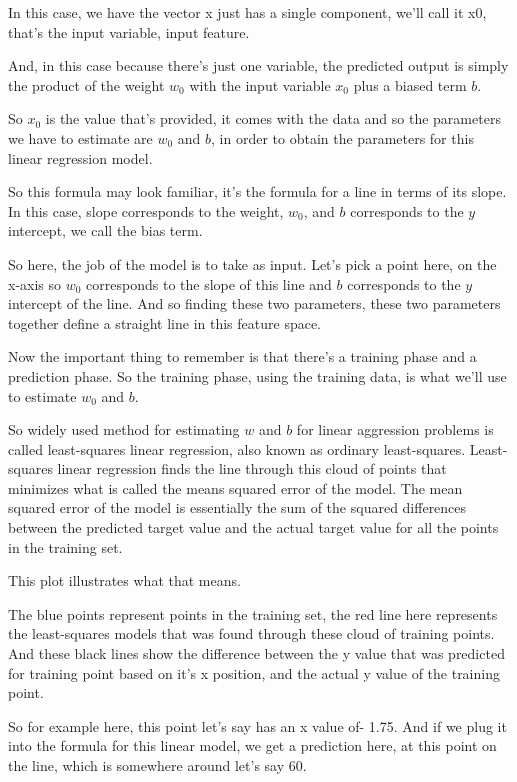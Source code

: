 \begin{multicols}{2}
In this case, we have the vector x just has a single component, we'll call it x0, that's the input variable, input feature. 

And, in this case because there's just one variable, the predicted output is simply the product of the weight $w_0$ with the input variable $x_0$ plus a biased term $b$. 

So $x_0$ is the value that's provided, it comes with the data and so the parameters we have to estimate are $w_0$ and $b$, in order to obtain the parameters for this linear regression model. 

So this formula may look familiar, it's the formula for a line in terms of its slope. In this case, slope corresponds to the weight, $w_0$, and $b$ corresponds to the $y$ intercept, we call the bias term. 

So here, the job of the model is to take as input. Let's pick a point here, on the x-axis so $w_0$ corresponds to the slope of this line and $b$ corresponds to the $y$ intercept of the line. And so finding these two parameters, these two parameters together define a straight line in this feature space. 

Now the important thing to remember is that there's a training phase and a prediction phase. So the training phase, using the training data, is what we'll use to estimate $w_0$ and $b$. 

So widely used method for estimating $w$ and $b$ for linear aggression problems is called least-squares linear regression, also known as ordinary least-squares. Least-squares linear regression finds the line through this cloud of points that minimizes what is called the means squared error of the model. The mean squared error of the model is essentially the sum of the squared differences between the predicted target value and the actual target value for all the points in the training set. 

This plot illustrates what that means. 

The blue points represent points in the training set, the red line here represents the least-squares models that was found through these cloud of training points. And these black lines show the difference between the y value that was predicted for training point based on it's x position, and the actual y value of the training point. 

So for example here, this point let's say has an x value of- 1.75. And if we plug it into the formula for this linear model, we get a prediction here, at this point on the line, which is somewhere around let's say 60. 


\end{multicols}
